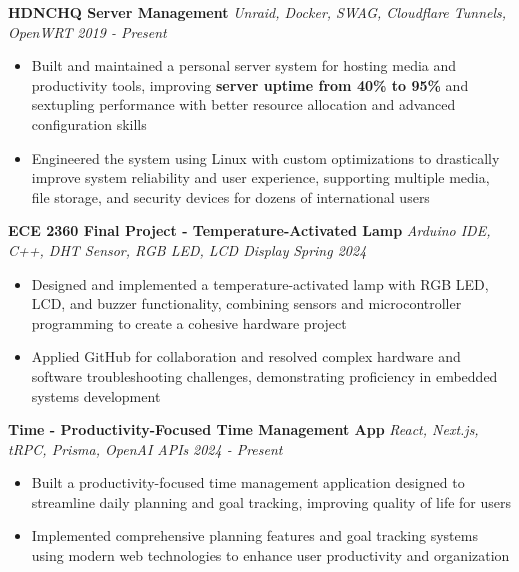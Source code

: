 \documentclass[letterpaper]{article}
\newenvironment{tightitemize}{%
  \begin{itemize}\small\setlength{\baselineskip}{0.95\baselineskip}\itemsep -1mm%
}{\end{itemize}}
\begin{document}
    {\textbf{HDNCHQ Server Management}} {\sl Unraid, Docker, SWAG, Cloudflare Tunnels, OpenWRT} \hfill \textsl{2019 - Present}\\
    \vspace{-2mm}
    \begin{tightitemize} \itemsep -1mm

        \item Built and maintained a personal server system for hosting media and productivity tools, improving \textbf{server uptime from 40\% to 95\%} and sextupling performance with better resource allocation and advanced configuration skills
        
        \item Engineered the system using Linux with custom optimizations to drastically improve system reliability and user experience, supporting multiple media, file storage, and security devices for dozens of international users
        
    \end{tightitemize}
    \vspace{-2mm}

    {\textbf{ECE 2360 Final Project - Temperature-Activated Lamp}} {\sl Arduino IDE, C++, DHT Sensor, RGB LED, LCD Display} \hfill \textsl{Spring 2024}\\
    \vspace{-2mm}
    \begin{tightitemize} \itemsep -1mm

        \item Designed and implemented a temperature-activated lamp with RGB LED, LCD, and buzzer functionality, combining sensors and microcontroller programming to create a cohesive hardware project
        
        \item Applied GitHub for collaboration and resolved complex hardware and software troubleshooting challenges, demonstrating proficiency in embedded systems development
        
    \end{tightitemize}
    \vspace{-2mm}

    {\textbf{Time - Productivity-Focused Time Management App}} {\sl React, Next.js, tRPC, Prisma, OpenAI APIs} \hfill \textsl{2024 - Present}\\
    \vspace{-2mm}
    \begin{tightitemize} \itemsep -1mm

        \item Built a productivity-focused time management application designed to streamline daily planning and goal tracking, improving quality of life for users
        
        \item Implemented comprehensive planning features and goal tracking systems using modern web technologies to enhance user productivity and organization
        
    \end{tightitemize}
    \vspace{-2mm}
\end{document}
